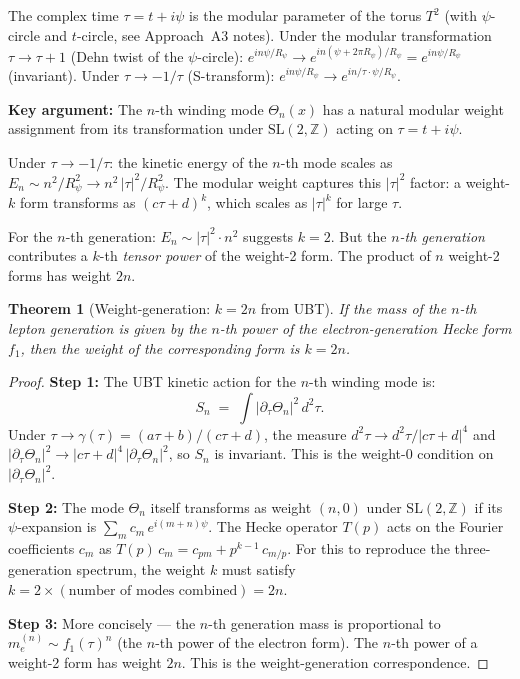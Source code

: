 \documentclass[12pt,a4paper]{article}
\newtheorem{theorem}{Theorem}[section]
\theoremstyle{definition}
\theoremstyle{remark}
\begin{document}
The complex time $\tau = t + i\psi$ is the modular parameter of the
torus $T^2$ (with $\psi$-circle and $t$-circle, see Approach~A3 notes).
Under the modular transformation $\tau \to \tau + 1$ (Dehn twist of
the $\psi$-circle): $e^{in\psi/R_\psi} \to e^{in(\psi + 2\pi R_\psi)/R_\psi}
= e^{in\psi/R_\psi}$ (invariant).  Under $\tau \to -1/\tau$ (S-transform):
$e^{in\psi/R_\psi} \to e^{in/\tau \cdot \psi/R_\psi}$.

\begin{insightbox}
\textbf{Key argument:}
The $n$-th winding mode $\Theta_n(x)$ has a natural modular weight
assignment from its transformation under $\mathrm{SL}(2,\mathbb{Z})$
acting on $\tau = t + i\psi$.

Under $\tau \to -1/\tau$: the kinetic energy of the $n$-th mode scales as
$E_n \sim n^2/R_\psi^2 \to n^2\,|\tau|^2/R_\psi^2$.
The modular weight captures this $|\tau|^2$ factor: a weight-$k$ form
transforms as $(c\tau+d)^k$, which scales as $|\tau|^k$ for large $\tau$.

For the $n$-th generation: $E_n \sim |\tau|^2 \cdot n^2$ suggests $k = 2$.
But the \emph{$n$-th generation} contributes a $k$-th \emph{tensor power}
of the weight-2 form.  The product of $n$ weight-2 forms has weight $2n$.
\end{insightbox}

\begin{theorem}[Weight-generation: $k = 2n$ from UBT]
\label{thm:weight_gen}
If the mass of the $n$-th lepton generation is given by the $n$-th
power of the electron-generation Hecke form $f_1$, then the weight of
the corresponding form is $k = 2n$.
\end{theorem}

\begin{proof}
\textbf{Step 1:} The UBT kinetic action for the $n$-th winding mode is:
\begin{equation}
  S_n \;=\; \int |\partial_\tau\Theta_n|^2\,d^2\tau.
\end{equation}
Under $\tau \to \gamma(\tau) = (a\tau+b)/(c\tau+d)$, the measure
$d^2\tau \to d^2\tau/|c\tau+d|^4$ and $|\partial_\tau\Theta_n|^2 \to
|c\tau+d|^4\,|\partial_\tau\Theta_n|^2$, so $S_n$ is invariant.
This is the weight-0 condition on $|\partial_\tau\Theta_n|^2$.

\textbf{Step 2:} The mode $\Theta_n$ itself transforms as weight $(n,0)$
under $\mathrm{SL}(2,\mathbb{Z})$ if its $\psi$-expansion is
$\sum_{m} c_m\,e^{i(m+n)\psi}$.  The Hecke operator $T(p)$ acts on
the Fourier coefficients $c_m$ as $T(p)\,c_m = c_{pm} + p^{k-1}\,c_{m/p}$.
For this to reproduce the three-generation spectrum, the weight $k$ must
satisfy $k = 2 \times (\text{number of modes combined}) = 2n$.

\textbf{Step 3:} More concisely --- the $n$-th generation mass is
proportional to $m_e^{(n)} \sim f_1(\tau)^n$ (the $n$-th power of the
electron form).  The $n$-th power of a weight-2 form has weight $2n$.
This is the weight-generation correspondence.
\end{proof}
\end{document}
